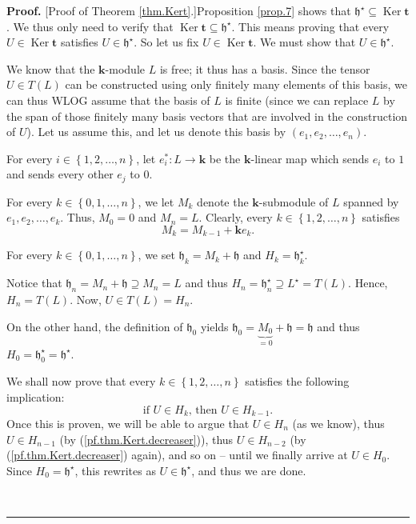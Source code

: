 \documentclass[numbers=enddot,12pt,final,onecolumn,notitlepage]{scrartcl}%
\theoremstyle{definition}
\newenvironment{proof}[1][Proof]{\noindent\textbf{#1.} }{\ \rule{0.5em}{0.5em}}
\begin{document}
\begin{proof}
[Proof of Theorem \ref{thm.Kert}.]Proposition \ref{prop.7} shows that
$\mathfrak{h}^{\star}\subseteq\operatorname*{Ker}\mathbf{t}$. We thus only
need to verify that $\operatorname*{Ker}\mathbf{t}\subseteq\mathfrak{h}%
^{\star}$. This means proving that every $U\in\operatorname*{Ker}\mathbf{t}$
satisfies $U\in\mathfrak{h}^{\star}$. So let us fix $U\in\operatorname*{Ker}%
\mathbf{t}$. We must show that $U\in\mathfrak{h}^{\star}$.

We know that the $\mathbf{k}$-module $L$ is free; it thus has a basis. Since
the tensor $U\in T\left(  L\right)  $ can be constructed using only finitely
many elements of this basis, we can thus WLOG assume that the basis of $L$ is
finite (since we can replace $L$ by the span of those finitely many basis
vectors that are involved in the construction of $U$). Let us assume this, and
let us denote this basis by $\left(  e_{1},e_{2},\ldots,e_{n}\right)  $.

For every $i\in\left\{  1,2,\ldots,n\right\}  $, let $e_{i}^{\ast
}:L\rightarrow\mathbf{k}$ be the $\mathbf{k}$-linear map which sends $e_{i}$
to $1$ and sends every other $e_{j}$ to $0$.

For every $k\in\left\{  0,1,\ldots,n\right\}  $, we let $M_{k}$ denote the
$\mathbf{k}$-submodule of $L$ spanned by $e_{1},e_{2},\ldots,e_{k}$. Thus,
$M_{0}=0$ and $M_{n}=L$. Clearly, every $k\in\left\{  1,2,\ldots,n\right\}  $
satisfies%
\begin{equation}
M_{k}=M_{k-1}+\mathbf{k}e_{k}. \label{pf.thm.Kert.Mk}%
\end{equation}


For every $k\in\left\{  0,1,\ldots,n\right\}  $, we set $\mathfrak{h}%
_{k}=M_{k}+\mathfrak{h}$ and $H_{k}=\mathfrak{h}_{k}^{\star}$.

Notice that $\mathfrak{h}_{n}=M_{n}+\mathfrak{h}\supseteq M_{n}=L$ and thus
$H_{n}=\mathfrak{h}_{n}^{\star}\supseteq L^{\star}=T\left(  L\right)  $.
Hence, $H_{n}=T\left(  L\right)  $. Now, $U\in T\left(  L\right)  =H_{n}$.

On the other hand, the definition of $\mathfrak{h}_{0}$ yields $\mathfrak{h}%
_{0}=\underbrace{M_{0}}_{=0}+\mathfrak{h}=\mathfrak{h}$ and thus
$H_{0}=\mathfrak{h}_{0}^{\star}=\mathfrak{h}^{\star}$.

We shall now prove that every $k\in\left\{  1,2,\ldots,n\right\}  $ satisfies
the following implication:%
\begin{equation}
\text{if }U\in H_{k}\text{, then }U\in H_{k-1}. \label{pf.thm.Kert.decreaser}%
\end{equation}
Once this is proven, we will be able to argue that $U\in H_{n}$ (as we know),
thus $U\in H_{n-1}$ (by (\ref{pf.thm.Kert.decreaser})), thus $U\in H_{n-2}$
(by (\ref{pf.thm.Kert.decreaser}) again), and so on -- until we finally arrive
at $U\in H_{0}$. Since $H_{0}=\mathfrak{h}^{\star}$, this rewrites as
$U\in\mathfrak{h}^{\star}$, and thus we are done.


\end{proof}
\end{document}
